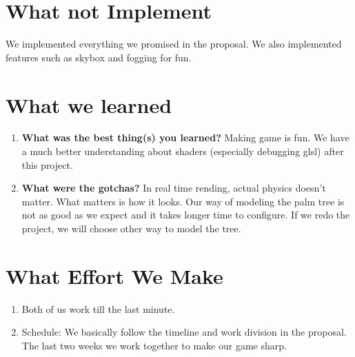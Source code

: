 \documentclass[annual]{acmsiggraph}
\begin{document}
\section{What not Implement}
We implemented everything we promised in the proposal. We also implemented features such as skybox and fogging for fun.

\section{What we learned}
\begin{enumerate}
\item{\textbf{What was the best thing(s) you learned?} Making game is fun. We have a much better understanding about shaders (especially debugging glsl) after this project.}
\item{\textbf{What were the gotchas?} In real time rending, actual physics doesn't matter. What matters is how it looks. Our way of modeling the palm tree is not as good as we expect and it takes longer time to configure. If we redo the project, we will choose other way to model the tree.}
\end{enumerate}

\section{What Effort We Make}
\begin{enumerate}
\item{Both of us work till the last minute.}
\item{Schedule}: We basically follow the timeline and work division in the proposal. The last two weeks we work together to make our game sharp. 
\end{enumerate}

\nocite{*}


\end{document}
